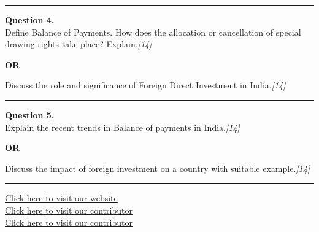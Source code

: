 \documentclass[11pt,a4paper]{article}
\newcommand{\pts}[1]{\hfill   \textit{[#1]}}
\begin{document}
\medskip\rule{\linewidth}{0.2pt}




\noindent   \textbf{Question 4.} \\
Define Balance of Payments. How does the allocation or cancellation of special drawing rights take place? Explain.\pts{14}

\centerline{   \textbf{OR}}

Discuss the role and significance of Foreign Direct Investment in India.\pts{14}

\medskip\rule{\linewidth}{0.2pt}




\noindent   \textbf{Question 5.} \\
Explain the recent trends in Balance of payments in India.\pts{14}

\centerline{   \textbf{OR}}

Discuss the impact of foreign investment on a country with suitable example.\pts{14}

\vfill
\rule{\linewidth}{0.4pt}

\begin{center}\small
\href{https://bhu-exam.vercel.app/}{Click here to visit our website}\\[4pt]
\href{https://me-aryan.vercel.app/}{Click here to visit our contributor}\\[4pt]
\href{https://quashan-me.vercel.app/}{Click here to visit our contributor}
\end{center}
\end{document}
